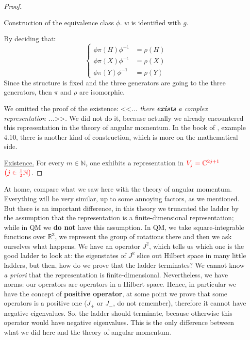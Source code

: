 \documentclass[../main.tex]{subfiles}
\begin{document}
\begin{proof}
\begin{marginfigure}[-12mm]
	\caption[Construction of the equivalence class $\phi$]{Construction of the equivalence class $\phi$. $w$ is identified with $g$.}
\end{marginfigure}
By deciding that:
\[
\left\{
\begin{split}
\phi\pi(H)\phi^{-1}&=\rho(H)\\
\phi\pi(X)\phi^{-1}&=\rho(X)\\
\phi\pi(Y)\phi^{-1}&=\rho(Y)
\end{split}
\right.
\]
Since the structure is fixed and the three generators
are going to the three generators, then $\pi$ and $\rho$ are isomorphic.

We omitted the proof of the existence:  <<\textit{... there \textbf{exists} a complex representation ...}>>. We did not do it, because actually we already encountered this representation in the theory of angular momentum. In the book of , example 4.10, there is another kind of construction, which is more on the mathematical side.

\underline{Existence.} For every $m\in\mathbb{N}$, one exhibits a representation in ${\color{red}V_j=\mathbb{C}^{2j+1}}$ ${\color{red} \left(j\in\frac{1}{2}\mathbb{N}\right)}$.
\end{proof}

At home, compare what we saw here with the theory of angular momentum. Everything will be very similar, up to some annoying factors, as we mentioned. But there is an important difference, in this theory we truncated the ladder by the assumption that the representation is a finite-dimensional representation; while in QM we \textbf{do not} have this assumption. In QM, we take square-integrable functions over $\mathbb{R}^3$, we represent the group of rotations there and then we ask ourselves what happens. We have an operator $J^2$, which tells us which one is the good ladder to look at: the eigenstates of $J^2$ slice out Hilbert space in many little ladders, but then, how do we prove that the ladder terminates? We cannot know \textit{a priori} that the representation is finite-dimensional. Nevertheless, we have norms: our operators are operators in a Hilbert space. Hence, in particular we have the concept of \textbf{positive operator}, at some point we prove that some operators is a positive one ($J_+$ or $J_-$, do not remember), therefore it cannot have negative eigenvalues. So, the ladder should terminate, because otherwise this operator would have negative eigenvalues. This is the only difference between what we did here and the theory of angular momentum.
\end{document}
